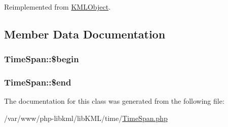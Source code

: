 Reimplemented from \hyperlink{classKMLObject_ae3c03ef6e733a6e8e59fb28672d4e334}{KMLObject}.



\subsection{Member Data Documentation}
\hypertarget{classTimeSpan_af21cdc4550f02c0399bec9b5ee8c7af7}{
\subsubsection[{\$begin}]{\setlength{\rightskip}{0pt plus 5cm}TimeSpan::\$begin}}
\label{d8/d48/classTimeSpan_af21cdc4550f02c0399bec9b5ee8c7af7}
\hypertarget{classTimeSpan_a6d6e629d00d16d14bb7efcef76844393}{
\subsubsection[{\$end}]{\setlength{\rightskip}{0pt plus 5cm}TimeSpan::\$end}}
\label{d8/d48/classTimeSpan_a6d6e629d00d16d14bb7efcef76844393}


The documentation for this class was generated from the following file:\begin{DoxyCompactItemize}
\item 
/var/www/php-\/libkml/libKML/time/\hyperlink{TimeSpan_8php}{TimeSpan.php}\end{DoxyCompactItemize}
